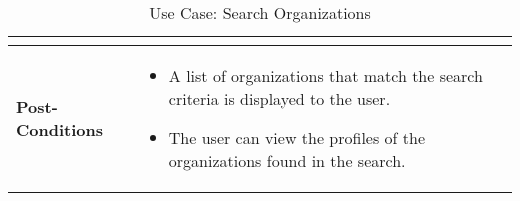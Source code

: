 \begin{table}[!ht]
\begin{tabularx}{\textwidth}{|l|X|}
\begin{itemize}[label=--,itemsep=0pt]
        \end{itemize} \\
        \hline
        \textbf{Post-Conditions} & 
        \begin{itemize}[label=--,itemsep=0pt]
            \item A list of organizations that match the search criteria is displayed to the user.
            \item The user can view the profiles of the organizations found in the search.
        \end{itemize} \\
        \hline
    \end{tabularx}
    \caption{Use Case: Search Organizations}
    \label{tab:use-case-search-organizations}
\end{table}


